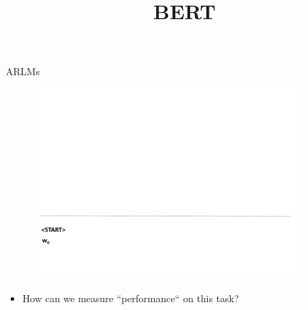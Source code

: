 


\usepackage{animate}

\newcommand{\titlefigure}{figure/metrics.png}
\newcommand{\learninggoals}{
\item Metrics for text output
\item Task-specific metrics
\item Task-agnostic model evaluation}

\title{BERT}
\date{}




\begin{frame}{ARLMs}

\vspace{-1cm}

	\begin{figure}
		\centering
		\includegraphics[width=10cm,page=13]{figure/arlm.pdf}
	\end{figure}
	
\begin{itemize}
	\item \ques How can we measure ``performance`` on this task? 
\end{itemize}

\vfill

\end{frame}


